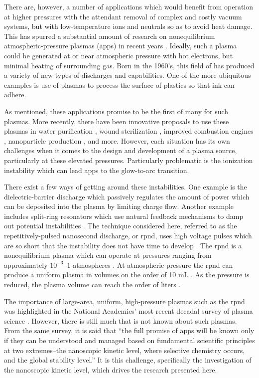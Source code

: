 There are, however, a number of applications which would benefit from operation
at higher pressures with the attendant removal of complex and costly vacuum
systems, but with low-temperature ions and neutrals so as to avoid heat damage.
This has spurred a substantial amount of research on nonequilibrium
atmospheric-pressure plasmas (\acs{app}s) in recent years \cite{Becker2005,
Starikovskii2009, Nishihara2011, Laroussi2005, Walsh2006, Lu2006}. Ideally, such
a plasma could be generated at or near atmospheric pressure with hot electrons,
but minimal heating of surrounding gas. Born in the 1960's, this field of has
produced a variety of new types of discharges and capabilities. One of the more
ubiquitous examples is use of plasmas to process the surface of plastics so that
ink can adhere.

As mentioned, these applications promise to be the first of many for such
plasmas. More recently, there have been innovative proposals to use these
plasmas in water purification \cite{Malik2001}, wound sterilization
\cite{Ayan2009}, improved combustion engines \cite{Nishihara2007}, nanoparticle
production \cite{Ostrikov2011}, and more. However, each situation has its own
challenges when it comes to the design and development of a plasma source,
particularly at these elevated pressures. Particularly problematic is the
ionization instability which can lead \acs{app}s to the glow-to-arc transition.

There exist a few ways of getting around these instabilities. One example is the
dielectric-barrier discharge which passively regulates the amount of power which
can be deposited into the plasma \cite{Kogelschatz2003} by limiting charge flow.
Another example includes split-ring resonators which use natural feedback
mechanisms to damp out potential instabilities \cite{Iza2005}. The technique
considered here, referred to as the repetitively-pulsed nanosecond discharge, or
\acs{rpnd}, uses high voltage pulses which are so short that the instability
does not have time to develop \cite{Adamovich2008}. The \acs{rpnd} is a
nonequilibrium plasma which can operate at pressures ranging from approximately
$10^{-3}$--$1$ atmospheres \cite{Vasilyak1994}. At atmospheric pressure the
\acs{rpnd} can produce a uniform plasma in volumes on the order of 10 mL
\cite{Walsh2006}. As the pressure is reduced, the plasma volume can reach the
order of liters \cite{Starikovskaia1998}.

The importance of large-area, uniform, high-pressure plasmas such as the
\acs{rpnd} was highlighted in the National Academies' most recent decadal survey
of plasma science \cite{NA2007}. However, there is still much that is not known
about such plasmas. From the same survey, it is said that ``the full promise of
\acs{app}s will be known only if they can be understood and managed based on
fundamental scientific principles at two extremes--the nanoscopic kinetic level,
where selective chemistry occurs, and the global stability level.'' It is this
challenge, specifically the investigation of the nanoscopic kinetic level, which
drives the research presented here.

